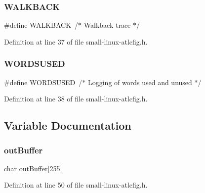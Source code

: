 \subsubsection{\texorpdfstring{W\+A\+L\+K\+B\+A\+CK}{WALKBACK}}
{\footnotesize\ttfamily \#define W\+A\+L\+K\+B\+A\+CK~/$\ast$ Walkback trace $\ast$/}



Definition at line 37 of file small-\/linux-\/atlcfig.\+h.

\mbox{\label{small-linux-atlcfig_8h_a1832f63df1cc6543af5e3de731b77dac}} 
\subsubsection{\texorpdfstring{W\+O\+R\+D\+S\+U\+S\+ED}{WORDSUSED}}
{\footnotesize\ttfamily \#define W\+O\+R\+D\+S\+U\+S\+ED~/$\ast$ Logging of words used and unused $\ast$/}



Definition at line 38 of file small-\/linux-\/atlcfig.\+h.



\subsection{Variable Documentation}
\mbox{\label{small-linux-atlcfig_8h_a2f25dee1596892b07e30dd78f5ebe81b}} 
\subsubsection{\texorpdfstring{out\+Buffer}{outBuffer}}
{\footnotesize\ttfamily char out\+Buffer\mbox{[}255\mbox{]}}



Definition at line 50 of file small-\/linux-\/atlcfig.\+h.

